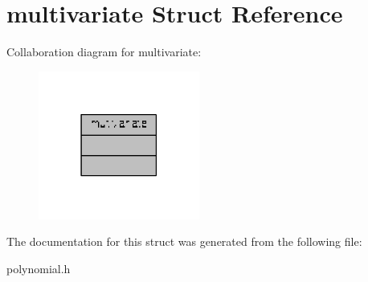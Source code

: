 \hypertarget{structmultivariate}{\section{multivariate Struct Reference}
\label{structmultivariate}
}


Collaboration diagram for multivariate\-:
\nopagebreak
\begin{figure}[H]
\begin{center}
\leavevmode
\includegraphics[width=150pt]{structmultivariate__coll__graph}
\end{center}
\end{figure}


The documentation for this struct was generated from the following file\-:\begin{DoxyCompactItemize}
\item 
polynomial.\-h\end{DoxyCompactItemize}
